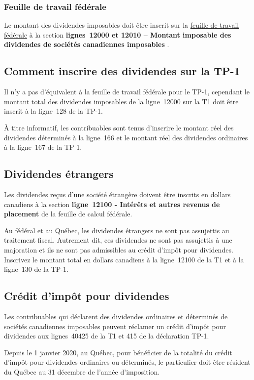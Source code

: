 \subsubsection{Feuille de travail fédérale}
Le montant des dividendes imposables doit être inscrit sur la \href{https://www.canada.ca/fr/agence-revenu/services/formulaires-publications/trousses-impot-toutes-annees-imposition/trousse-generale-impot-prestations/5000-d1.html}{feuille de travail fédérale} à la section \og \textbf{lignes~12000 et 12010 – Montant imposable des dividendes de sociétés canadiennes imposables} \fg{}.

\subsection{Comment inscrire des dividendes sur la TP-1}
Il n'y a pas d'équivalent à la feuille de travail fédérale pour le TP-1, cependant le montant total des dividendes imposables de la ligne~12000 sur la T1 doit être inscrit à la ligne~128 de la TP-1.

À titre informatif, les contribuables sont tenus d'inscrire le montant réel des dividendes déterminés à la ligne~166 et le montant réel des dividendes ordinaires à la ligne~167 de la TP-1.


\subsection{Dividendes étrangers}
Les dividendes reçus d'une société étrangère doivent être inscrits en dollars canadiens à la section \og \textbf{ligne~12100 - Intérêts et autres revenus de placement} \fg{} de la feuille de calcul fédérale.

Au fédéral et au Québec, les dividendes étrangers ne sont pas assujettis au traitement fiscal. Autrement dit, ces dividendes ne sont pas assujettis à une majoration et ils ne sont pas admissibles au crédit d'impôt pour dividendes. Inscrivez le montant total en dollars canadiens à la ligne~12100 de la T1 et à la ligne~130 de la TP-1.

\subsection{Crédit d'impôt pour dividendes}
Les contribuables qui déclarent des dividendes ordinaires et déterminés de sociétés canadiennes imposables peuvent réclamer un crédit d'impôt pour dividendes aux lignes~40425 de la T1 et 415 de la déclaration TP-1. 

\begin{note}
	Depuis le 1\ier{} janvier 2020, au Québec, pour bénéficier de la totalité du crédit d'impôt pour dividendes ordinaires ou déterminés, le particulier doit être résident du Québec au 31 décembre de l'année d'imposition.
\end{note}


